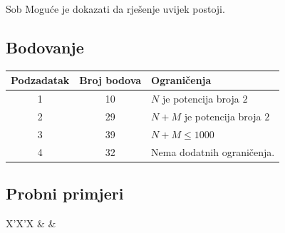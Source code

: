 \begin{statement}[
  problempoints=110,
  timelimit=1 sekunda,
  memorylimit=512 MiB,
]{Sob}
Moguće je dokazati da rješenje uvijek postoji.

 \subsection*{Bodovanje}
{\renewcommand{\arraystretch}{1.4}
  \setlength{\tabcolsep}{6pt}
  \begin{tabular}{ccl}
 Podzadatak & Broj bodova & Ograničenja \\ \midrule
  1 & 10 & $N$ je potencija broja $2$ \\
  2 & 29 & $N + M$ je potencija broja $2$ \\
  3 & 39 & $N + M \le 1000$ \\
  4 & 32 & Nema dodatnih ograničenja.
\end{tabular}}

\subsection*{Probni primjeri}
\begin{tabularx}{\textwidth}{X'X'X}
 &
 &
\end{tabularx}

\end{statement}

